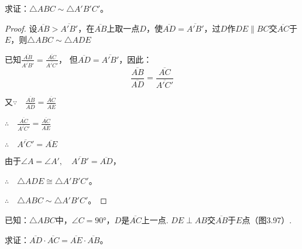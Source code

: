 求证：$\triangle ABC\sim \triangle A'B'C'$。

\begin{figure}
    \centering
\begin{tikzpicture}

\end{tikzpicture}
    \caption{}
\end{figure}

\begin{proof}
设$\overline{AB}>\overline{A'B'}$，在$\overline{AB}$上取一点$D$，使$\overline{AD}=\overline{A'B'}$，过$D$作$DE\parallel BC$交$\overline{AC}$于$E$，则$\triangle ABC\sim \triangle ADE$

已知$\frac{\overline{AB}}{\overline{A'B'}}=\frac{\overline{AC}}{\overline{A'C'}}$，
但$\overline{AD}=\overline{A'B'}$，因此：
\[\frac{\overline{AB}}{\overline{AD}}=\frac{\overline{AC}}{\overline{A'C'}}\]

又$\because\quad \frac{\overline{AB}}{\overline{AD}}=\frac{\overline{AC}}{\overline{AE}}$

$\therefore\quad \frac{\overline{AC}}{\overline{A'C'}}=\frac{\overline{AC}}{\overline{AE}}$

$\therefore\quad \overline{A'C'}=\overline{AE}$

由于$\angle A=\angle A',\quad \overline{A'B'}=\overline{AD}$，

$\therefore\quad \triangle ADE\cong \triangle A'B'C'$。

$\therefore\quad \triangle ABC\sim \triangle A'B'C'$。
\end{proof}

\begin{example}
    已知：$\triangle ABC$中，$\angle C=\ang{90}$，$D$是$\overline{AC}$上一点. 
    $DE\perp AB$交$\overline{AB}$于$E$点（图3.97）.

    求证：$\overline{AD}\cdot \overline{AC}=\overline{AE}\cdot \overline{AB}$。
\end{example}

